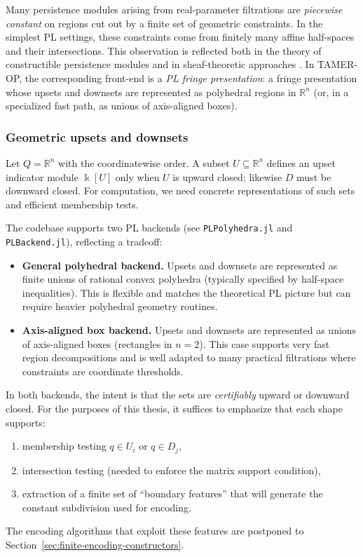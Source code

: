 \documentclass{article}
\newcommand{\kk}{\Bbbk}
\newcommand{\<}{\langle}
\renewcommand{\>}{\rangle}
\theoremstyle{definition}
\theoremstyle{remark}
\begin{document}
	Many persistence modules arising from real-parameter filtrations are \emph{piecewise constant} on regions cut out by a finite set of geometric constraints.  In the simplest PL settings, these constraints come from finitely many affine half-spaces and their intersections.  This observation is reflected both in the theory of constructible persistence modules and in sheaf-theoretic approaches \cite{KS18,Mil23}.  In TAMER-OP, the corresponding front-end is a \emph{PL fringe presentation}: a fringe presentation whose upsets and downsets are represented as polyhedral regions in $\mathbb{R}^n$ (or, in a specialized fast path, as unions of axis-aligned boxes).
	
	\subsubsection*{Geometric upsets and downsets}
	
	Let $Q=\mathbb{R}^n$ with the coordinatewise order.
	A subset $U\subseteq \mathbb{R}^n$ defines an upset indicator module $\kk[U]$ only when $U$ is upward closed;
	likewise $D$ must be downward closed.  For computation, we need concrete representations of such sets and efficient
	membership tests.
	
	The codebase supports two PL backends (see \texttt{PLPolyhedra.jl} and \texttt{PLBackend.jl}), reflecting a  tradeoff:
	\begin{itemize}
		\item \textbf{General polyhedral backend.}  Upsets and downsets are represented as finite unions of rational
		convex polyhedra (typically specified by half-space inequalities).  This is flexible and matches the theoretical
		PL picture but can require heavier polyhedral geometry routines.
		\item \textbf{Axis-aligned box backend.}  Upsets and downsets are represented as unions of axis-aligned boxes
		(rectangles in $n=2$).  This case supports very fast region decompositions and is well adapted to many practical
		filtrations where constraints are coordinate thresholds.
	\end{itemize}
	In both backends, the intent is that the sets are \emph{certifiably} upward or downward closed.  For the purposes of
	this thesis, it suffices to emphasize that each shape supports:
	\begin{enumerate}[label=(\roman*)]
		\item membership testing $q\in U_i$ or $q\in D_j$,
		\item intersection testing (needed to enforce the matrix support condition),
		\item extraction of a finite set of ``boundary features'' that will generate the constant subdivision used for
		encoding.
	\end{enumerate}
	The encoding algorithms that exploit these features are postponed to Section~\ref{sec:finite-encoding-constructors}.
	
\end{document}
